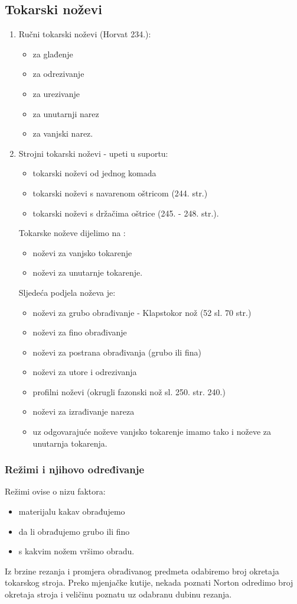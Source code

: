 \documentclass[a4paper,12pt]{article}
\numberwithin{figure}{section}
\begin{document}
\subsection{Tokarski noževi} 
\begin{enumerate}
\item Ručni tokarski noževi (Horvat 234.):
\begin{itemize}
\item za glađenje
\item za odrezivanje
\item za urezivanje
\item za unutarnji narez
\item za vanjski narez.
\end{itemize}
\item Strojni tokarski noževi - upeti u suportu:
\begin{itemize}
\item tokarski noževi od jednog komada
\item tokarski noževi s navarenom oštricom (244. str.)
\item tokarski noževi s držačima oštrice (245. - 248. str.).
\end{itemize}
Tokarske noževe dijelimo na :
\begin{itemize}
\item noževi za vanjsko tokarenje
\item noževi za unutarnje tokarenje.
\end{itemize}
Sljedeća podjela noževa je:
\begin{itemize}
\item noževi za grubo obrađivanje - Klapstokor nož (52 sl. 70 str.)
\item noževi za fino obrađivanje
\item noževi za postrana obrađivanja (grubo ili fina)
\item noževi za utore i odrezivanja
\item profilni noževi (okrugli fazonski nož sl. 250. str. 240.)
\item noževi za izrađivanje nareza
\item uz odgovarajuće noževe vanjsko tokarenje imamo tako i noževe za unutarnja tokarenja.
\end{itemize}
\end{enumerate}
\subsubsection{Režimi i njihovo određivanje}
Režimi ovise o nizu faktora:
\begin{itemize}
\item materijalu kakav obrađujemo
\item da li obrađujemo grubo ili fino
\item s kakvim nožem vršimo obradu.
\end{itemize}
Iz brzine rezanja i promjera obrađivanog predmeta odabiremo broj okretaja tokarskog stroja. Preko mjenjačke kutije, nekada poznati Norton odredimo broj okretaja stroja i veličinu poznatu uz odabranu dubinu rezanja.
\end{document}
